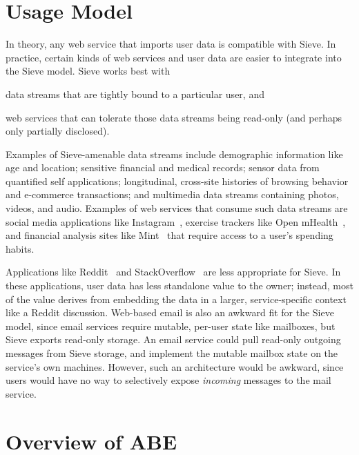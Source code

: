 \section{Usage Model}

In theory, any web service that imports
user data is compatible with Sieve. In
practice, certain kinds of web services
and user data are easier to integrate into
the Sieve model. Sieve works best with
  \begin{smitemize}
    \item data streams that are tightly
          bound to a particular user, and
    \item web services that can tolerate
          those data streams being read-only
          (and perhaps only partially disclosed).
  \end{smitemize}
Examples of Sieve-amenable data streams
include demographic information like age and
location; sensitive financial and medical
records; sensor data from quantified self
applications; longitudinal, cross-site
histories of browsing behavior and e-commerce
transactions; and multimedia data streams
containing photos, videos, and audio.
Examples of web services that consume such
data streams are social media applications
like Instagram~\cite{instagram}, 
exercise trackers like Open mHealth~\cite{omh}, 
and financial analysis sites like Mint~\cite{mint}
that require access to a user's spending habits.

Applications like Reddit~\cite{reddit} 
and StackOverflow~\cite{soverflow} are
less appropriate for Sieve. In these applications,
user data has less standalone value to the
owner; instead, most of the value derives from
embedding the data in a larger, service-specific
context like a Reddit discussion.
Web-based email is also an awkward fit for the
Sieve model, since email services require mutable,
per-user state like mailboxes, but Sieve exports
read-only storage. An email service could pull
read-only outgoing messages from Sieve storage,
and implement the mutable mailbox state on the
service's own machines. However, such an
architecture would be awkward, since users
would have no way to selectively expose
\emph{incoming} messages to the mail service.

\section{Overview of ABE}
\label{sec:abeOverview}

